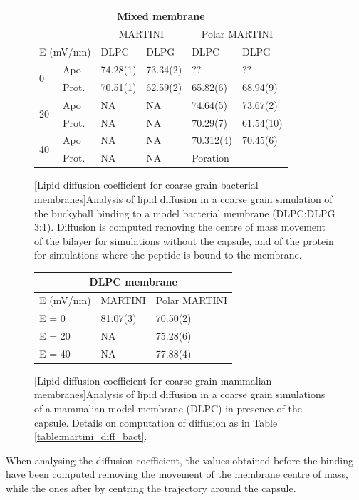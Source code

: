 \begin{figure}[h!]
\centering
 \def\arraystretch{1.5}
\begin{tabular}{ll|ll|ll}
\multicolumn{6}{c}{\textbf{Mixed membrane}} \\
 \hline
 && \multicolumn{2}{c|}{MARTINI} & \multicolumn{2}{c}{Polar MARTINI} \\
 \hline
 \multicolumn{2}{l|}{E (mV/nm)} & DLPC & DLPG & DLPC & DLPG \\\hline
 \multirow{2}{*}{0} & Apo
	& 74.28(1) & 73.34(2) & ?? & ?? \\
 				& Prot. & 70.51(1) & 62.59(2) & 65.82(6) & 68.94(9) \\
\multirow{2}{*}{20} & Apo & NA & NA & 74.64(5) & 73.67(2) \\
 	& Prot. & NA & NA & 70.29(7) & 61.54(10) \\ 
 \multirow{2}{*}{40} & Apo & NA & NA & 70.312(4) & 70.45(6) \\
					& Prot. & NA & NA & \multicolumn{2}{l}{Poration} \\
 \hline
\end{tabular}
[Lipid diffusion coefficient for coarse grain bacterial membranes]{Analysis of lipid diffusion in a coarse grain simulation of the buckyball binding to a model bacterial membrane (DLPC:DLPG 3:1). Diffusion is computed removing the centre of mass movement of the bilayer for simulations without the capsule, and of the protein for simulations where the peptide is bound to the membrane.}
\label{table:martini_diff_bact}

\begin{tabular}{l|ll}
\multicolumn{3}{c}{\textbf{DLPC membrane}} \\
 \hline
 E (mV/nm) & MARTINI & Polar MARTINI \\
 \hline
 E = 0		  & 81.07(3) & 70.50(2) \\
 E = 20 & NA & 75.28(6) \\
 E = 40 & NA & 77.88(4) \\
 \hline
\end{tabular}
[Lipid diffusion coefficient for coarse grain mammalian membranes]{Analysis of lipid diffusion in a coarse grain simulations of a mammalian model membrane (DLPC) in presence of the capsule. Details on computation of diffusion as in Table \ref{table:martini_diff_bact}.}
\label{table:martini_diff_dlpc}
\end{figure}
%
When analysing the diffusion coefficient, the values obtained before the binding have been computed removing the movement of the membrane centre of mass, while the ones after by centring the trajectory around the capsule.
